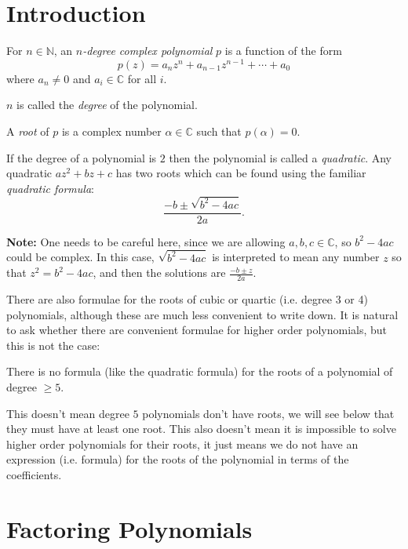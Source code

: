 \documentclass[11pt,dvipsnames]{book}
\numberwithin{figure}{section} %
\numberwithin{table}{section} %
\begin{document}
\section{Introduction}%
\label{introtopolynomials}

\begin{definition}
For $n\in\mathbb{N}$, an {\it $n$-degree complex polynomial} \(p\) is a function of the form
\begin{equation}
\label{e:pz}
p(z)=a_nz^n + a_{n-1}z^{n-1} + \cdots + a_0
\end{equation}
where $a_n \neq 0$ and $a_i \in \mathbb{C}$ for all $i$.

\(n\) is called the {\em degree} of the polynomial.

A {\it root} of $p$ is a complex number  $\alpha\in\mathbb{C}$ such that $p(\alpha)=0$.
\end{definition}

If the degree of a polynomial is \(2\) then the polynomial is called a {\em quadratic}.   Any quadratic $az^2+bz+c$ has two roots which can be found using the familiar {\it quadratic formula}:
\[\frac{-b\pm \sqrt{b^2-4ac}}{2a}.\]

{\bf Note:} One needs to be careful here, since we are allowing $a,b,c\in\mathbb{C}$, so  $b^2-4ac$ could be complex. In this case, $\sqrt{b^2-4ac}$ is interpreted to mean any number $z$ so that $z^2=b^2-4ac$, and then the solutions are $\frac{-b\pm z}{2a}$.

There are also formulae for the roots of cubic or quartic (i.e. degree 3 or 4) polynomials, although these are much less convenient to write down. It is natural to ask whether there are convenient formulae for higher order polynomials, but this is not the case:

\begin{theorem} There is no formula (like the quadratic formula) for the roots of a polynomial of degree $\geq 5$.
\end{theorem}

This doesn't mean degree $5$ polynomials don't have roots, we will see below that they must have at least one root. This also doesn't mean it is impossible to solve higher order polynomials for their roots, it just means we do not have an expression (i.e. formula) for the roots of the polynomial in terms of the coefficients.

\section{Factoring Polynomials}%
\label{factoringpolynomials}
\end{document}
